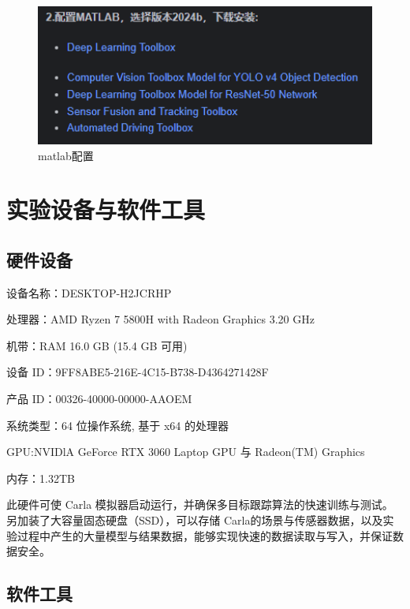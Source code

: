 \begin{figure}[htbp] %
	\centering
	\includegraphics[width=1\textwidth]{p8} %
	\caption{matlab配置} %
	\label{fig:p8} %
\end{figure}






\section{实验设备与软件工具}

\subsection{硬件设备}

设备名称：DESKTOP-H2JCRHP

处理器：AMD Ryzen 7 5800H with Radeon Graphics            3.20 GHz

机带：RAM	16.0 GB (15.4 GB 可用)

设备 ID：9FF8ABE5-216E-4C15-B738-D4364271428F

产品 ID：00326-40000-00000-AAOEM

系统类型：64 位操作系统, 基于 x64 的处理器

GPU:NVIDlA GeForce RTX 3060 Laptop GPU 与 Radeon(TM) Graphics

内存：1.32TB

此硬件可使 Carla 模拟器启动运行，并确保多目标跟踪算法的快速训练与测试。另加装了大容量固态硬盘（SSD），可以存储 Carla的场景与传感器数据，以及实验过程中产生的大量模型与结果数据，能够实现快速的数据读取与写入，并保证数据安全。

\subsection{软件工具}

